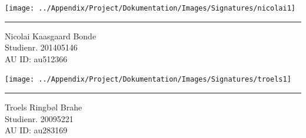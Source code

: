\begin{titlingpage}
\begin{center}
			\begin{minipage}{0.40\linewidth}
				\centering
				\texttt{[image: ../Appendix/Project/Dokumentation/Images/Signatures/nicolai1]}			
				\hrule
				\vspace{12pt}
				Nicolai Kaasgaard Bonde\\
				Studienr. 201405146\\
				AU ID: au512366
			\end{minipage}
			\hspace{50pt}
			\begin{minipage}{0.40\linewidth}
				\centering
				\texttt{[image: ../Appendix/Project/Dokumentation/Images/Signatures/troels1]}	
				\hrule
				\vspace{12pt}
				Troels Ringbøl Brahe\\
				Studienr. 20095221\\
				AU ID: au283169
			\end{minipage}
	\end{center}
\end{titlingpage}